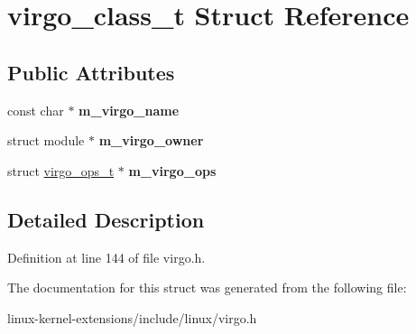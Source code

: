 \hypertarget{structvirgo__class__t}{\section{virgo\-\_\-class\-\_\-t Struct Reference}
\label{structvirgo__class__t}
}
\subsection*{Public Attributes}
\begin{DoxyCompactItemize}
\item 
\hypertarget{structvirgo__class__t_a73a801abe266e76e12345f099c3107b9}{const char $\ast$ {\bfseries m\-\_\-virgo\-\_\-name}}\label{structvirgo__class__t_a73a801abe266e76e12345f099c3107b9}

\item 
\hypertarget{structvirgo__class__t_a6094277e074b48e68e1509e0cb804449}{struct module $\ast$ {\bfseries m\-\_\-virgo\-\_\-owner}}\label{structvirgo__class__t_a6094277e074b48e68e1509e0cb804449}

\item 
\hypertarget{structvirgo__class__t_a8d523f450f882161b098d9a7de74b9a8}{struct \hyperlink{structvirgo__ops__t}{virgo\-\_\-ops\-\_\-t} $\ast$ {\bfseries m\-\_\-virgo\-\_\-ops}}\label{structvirgo__class__t_a8d523f450f882161b098d9a7de74b9a8}

\end{DoxyCompactItemize}


\subsection{Detailed Description}


Definition at line 144 of file virgo.\-h.



The documentation for this struct was generated from the following file\-:\begin{DoxyCompactItemize}
\item 
linux-\/kernel-\/extensions/include/linux/virgo.\-h\end{DoxyCompactItemize}

